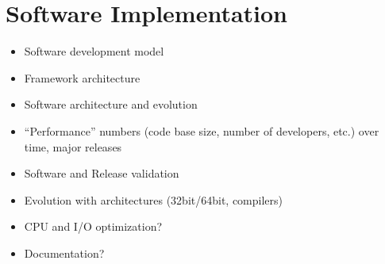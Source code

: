 \documentclass [draft,notitlepage] {article}
\begin{document}
\section{Software Implementation}
\begin{itemize}

\item Software development model

\item Framework architecture 

\item Software architecture and evolution

\item ``Performance'' numbers (code base size, number of developers, etc.) 
over time, major releases


\item Software and Release validation


\item Evolution with architectures (32bit/64bit, compilers)

\item CPU and I/O optimization?

\item Documentation?

\end{itemize}
\end{document}
